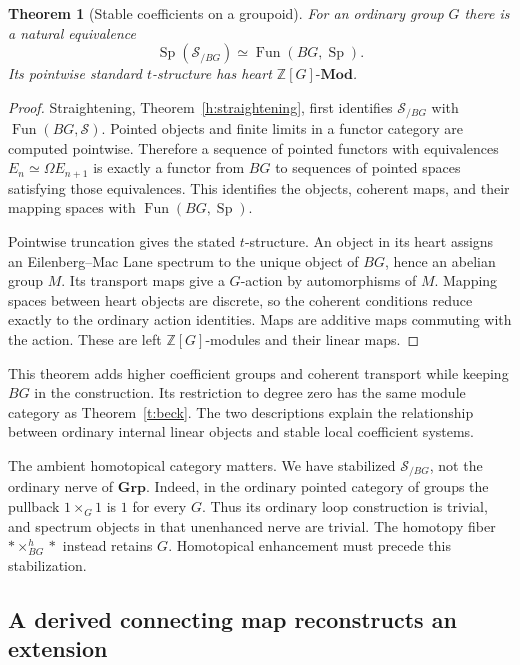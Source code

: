 \documentclass[11pt]{article}
\newtheorem{theorem}{Theorem}[section]
\theoremstyle{definition}
\theoremstyle{remark}\newtheorem{remark}[theorem]{Remark}
\begin{document}
\begin{theorem}[Stable coefficients on a groupoid]\label{t:spectra-over-bg}
For an ordinary group $G$ there is a natural equivalence
\[
 \operatorname{Sp}(\mathcal S_{/BG})
  \simeq\operatorname{Fun}(BG,\operatorname{Sp}).
\]
Its pointwise standard $t$-structure has heart
$\mathbb Z[G]\text{-}\mathbf{Mod}$.
\end{theorem}
\begin{proof}
Straightening, Theorem~\ref{h:straightening}, first identifies
$\mathcal S_{/BG}$ with $\operatorname{Fun}(BG,\mathcal S)$.
Pointed objects and finite limits in a functor category are computed
pointwise.  Therefore a sequence of pointed functors with equivalences
$E_n\simeq\Omega E_{n+1}$ is exactly a functor from $BG$ to sequences
of pointed spaces satisfying those equivalences.  This identifies the
objects, coherent maps, and their mapping spaces with
$\operatorname{Fun}(BG,\operatorname{Sp})$.

Pointwise truncation gives the stated $t$-structure.  An object in its
heart assigns an Eilenberg--Mac Lane spectrum to the unique object of
$BG$, hence an abelian group $M$.  Its transport maps give a $G$-action
by automorphisms of $M$.  Mapping spaces between heart objects are
discrete, so the coherent conditions reduce exactly to the ordinary
action identities.  Maps are additive maps commuting with the action.
These are left $\mathbb Z[G]$-modules and their linear maps.
\end{proof}

This theorem adds higher coefficient groups and coherent transport while
keeping $BG$ in the construction.  Its restriction to degree zero has
the same module category as Theorem~\ref{t:beck}.  The two descriptions
explain the relationship between ordinary internal linear objects and
stable local coefficient systems.

The ambient homotopical category matters.  We have stabilized
$\mathcal S_{/BG}$, not the ordinary nerve of $\mathbf{Grp}$.
Indeed, in the ordinary pointed category of groups the pullback
$1\times_G1$ is $1$ for every $G$.  Thus its ordinary loop construction
is trivial, and spectrum objects in that unenhanced nerve are trivial.
The homotopy fiber $*\times^h_{BG}*$ instead retains $G$.
Homotopical enhancement must precede this stabilization.

\subsection{A derived connecting map reconstructs an extension}
\end{document}
